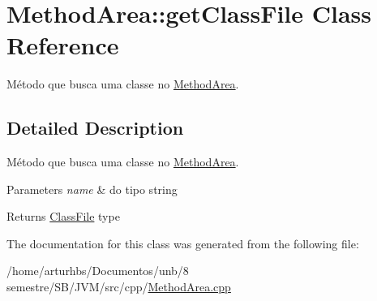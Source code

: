 \hypertarget{classMethodArea_1_1getClassFile}{}\section{Method\+Area\+:\+:get\+Class\+File Class Reference}
\label{classMethodArea_1_1getClassFile}


Método que busca uma classe no \hyperlink{classMethodArea}{Method\+Area}.  




\subsection{Detailed Description}
Método que busca uma classe no \hyperlink{classMethodArea}{Method\+Area}. 


\begin{DoxyParams}{Parameters}
{\em name} & do tipo string \\
\hline
\end{DoxyParams}
\begin{DoxyReturn}{Returns}
\hyperlink{classClassFile}{Class\+File} type 
\end{DoxyReturn}


The documentation for this class was generated from the following file\+:\begin{DoxyCompactItemize}
\item 
/home/arturhbs/\+Documentos/unb/8 semestre/\+S\+B/\+J\+V\+M/src/cpp/\hyperlink{MethodArea_8cpp}{Method\+Area.\+cpp}\end{DoxyCompactItemize}
